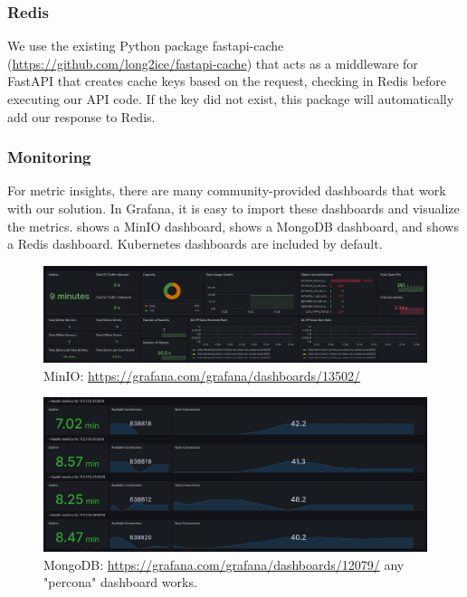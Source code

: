 \documentclass{report}
\begin{document}
    \subsubsection{Redis}
    We use the existing Python package fastapi-cache (\url{https://github.com/long2ice/fastapi-cache}) that acts as a middleware for FastAPI that creates cache keys based on the request, checking in Redis before executing our API code. If the key did not exist, this package will automatically add our response to Redis.

    \subsubsection{Monitoring}
    For metric insights, there are many community-provided dashboards that work with our solution. In Grafana, it is easy to import these dashboards and visualize the metrics.  shows a MinIO dashboard,  shows a MongoDB dashboard, and  shows a Redis dashboard. Kubernetes dashboards are included by default.
    \begin{figure}[H]
        \centering
        \includegraphics[width=\textwidth]{images/dashboard-minio}
        \caption{MinIO: \url{https://grafana.com/grafana/dashboards/13502/}}
        \label{fig:dashboard-minio}
    \end{figure}
    \begin{figure}[H]
        \centering
        \includegraphics[width=\textwidth]{images/dashboard-mongodb}
        \caption{MongoDB: \url{https://grafana.com/grafana/dashboards/12079/} any "percona" dashboard works.}
        \label{fig:dashboard-mongodb}
    \end{figure}
\end{document}
